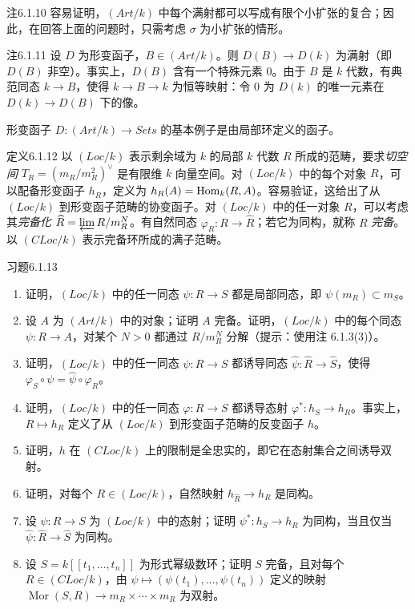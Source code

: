 \begin{origstatement}{注}{6.1.10}\label{ch06:6.1.10}
容易证明，$(Art/k)$ 中每个满射都可以写成有限个小扩张的复合；因此，在回答上面的问题时，只需考虑 $\sigma$ 为小扩张的情形。
\end{origstatement}
\begin{origstatement}{注}{6.1.11}\label{ch06:6.1.11}
设 $D$ 为形变函子，$B\in(Art/k)$。则 $D(B)\to D(k)$ 为满射（即 $D(B)$ 非空）。事实上，$D(B)$ 含有一个特殊元素 $0$。由于 $B$ 是 $k$ 代数，有典范同态
$k\to B$，使得 $k\to B\to k$ 为恒等映射：令 $0$ 为 $D(k)$ 的唯一元素在 $D(k)\to D(B)$ 下的像。
\end{origstatement}
形变函子 $D:(Art/k)\to Sets$ 的基本例子是由局部环定义的函子。

\begin{origstatement}{定义}{6.1.12}\label{ch06:6.1.12}
以 $(Loc/k)$ 表示剩余域为 $k$ 的局部 $k$ 代数 $R$ 所成的范畴，要求\emph{切空间} $T_R=(m_R/m_R^2)^\vee$ 是有限维 $k$ 向量空间。对 $(Loc/k)$ 中的每个对象 $R$，可以配备形变函子 $h_R$，定义为 $h_R(A)=\operatorname{Hom}_k(R,A)$。容易验证，这给出了从 $(Loc/k)$ 到形变函子范畴的协变函子。对 $(Loc/k)$ 中的任一对象 $R$，可以考虑其\emph{完备化} $\widehat R=\varprojlim R/m_R^N$。有自然同态 $\varphi_R:R\to\widehat R$；若它为同构，就称 $R$ \emph{完备}。以 $(CLoc/k)$ 表示完备环所成的满子范畴。
\end{origstatement}
\begin{origstatement}{习题}{6.1.13}\label{ch06:6.1.13}
\begin{enumerate}[label=(\arabic*)]
\item 证明，$(Loc/k)$ 中的任一同态 $\psi:R\to S$ 都是局部同态，即 $\psi(m_R)\subset m_S$。
\item 设 $A$ 为 $(Art/k)$ 中的对象；证明 $A$ 完备。证明，$(Loc/k)$ 中的每个同态 $\psi:R\to A$，对某个 $N>0$ 都通过 $R/m_R^N$ 分解（提示：使用注 6.1.3(3)）。
\item 证明，$(Loc/k)$ 中的任一同态 $\psi:R\to S$ 都诱导同态 $\widehat\psi:\widehat R\to\widehat S$，使得 $\varphi_S\circ\psi=\widehat\psi\circ\varphi_R$。
\item 证明，$(Loc/k)$ 中的任一同态 $\varphi:R\to S$ 都诱导态射 $\varphi^*:h_S\to h_R$。事实上，$R\mapsto h_R$ 定义了从 $(Loc/k)$ 到形变函子范畴的反变函子 $h$。
\item 证明，$h$ 在 $(CLoc/k)$ 上的限制是全忠实的，即它在态射集合之间诱导双射。
\item 证明，对每个 $R\in(Loc/k)$，自然映射 $h_{\widehat R}\to h_R$ 是同构。
\item 设 $\psi:R\to S$ 为 $(Loc/k)$ 中的态射；证明 $\psi^*:h_S\to h_R$ 为同构，当且仅当 $\widehat\psi:\widehat R\to\widehat S$ 为同构。
\item 设 $S=k[[t_1,\ldots,t_n]]$ 为形式幂级数环；证明 $S$ 完备，且对每个 $R\in(CLoc/k)$，由 $\psi\mapsto(\psi(t_1),\ldots,\psi(t_n))$ 定义的映射 $\operatorname{Mor}(S,R)\to m_R\times\cdots\times m_R$ 为双射。
\end{enumerate}
\end{origstatement}
